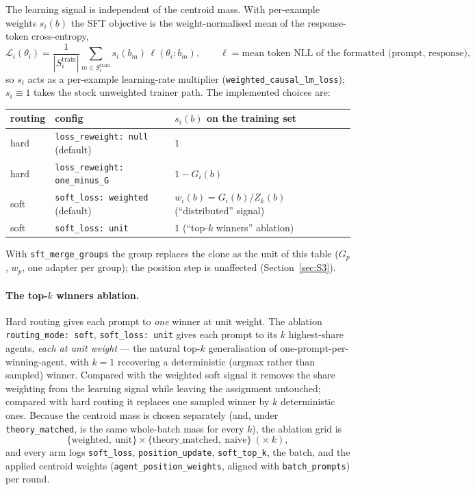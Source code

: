 \documentclass[11pt]{article}
\theoremstyle{remark}
\newcommand{\cfg}[1]{\texttt{#1}}
\begin{document}
The learning signal is independent of the centroid mass. With per-example
weights $s_i(b)$ the SFT objective is the weight-normalised mean of the
response-token cross-entropy,
\begin{equation}
  \mathcal{L}_i(\theta_i)=\frac{1}{|S_i^{\mathrm{train}}|}\sum_{m\in S_i^{\mathrm{train}}} s_i(b_m)\,\ell(\theta_i;b_m),
  \qquad \ell=\text{mean token NLL of the formatted (prompt, response)} ,
\end{equation}
so $s_i$ acts as a per-example learning-rate multiplier
(\texttt{weighted\_causal\_lm\_loss}); $s_i\equiv1$ takes the stock unweighted
trainer path. The implemented choices are:
\begin{center}
\begin{tabular}{@{}lll@{}}
\toprule
routing & config & $s_i(b)$ on the training set \\
\midrule
hard & \cfg{loss\_reweight: null} (default) & $1$ \\
hard & \cfg{loss\_reweight: one\_minus\_G} & $1-G_i(b)$ \\
soft & \cfg{soft\_loss: weighted} (default) & $w_i(b)=G_i(b)/Z_k(b)$ \quad(``distributed'' signal) \\
soft & \cfg{soft\_loss: unit} & $1$ \quad(``top-$k$ winners'' ablation) \\
\bottomrule
\end{tabular}
\end{center}
With \cfg{sft\_merge\_groups} the group replaces the clone as the unit of
this table ($G_p$, $w_p$, one adapter per group); the position step is
unaffected (Section~\ref{sec:S3}).

\paragraph{The top-$k$ winners ablation.}
Hard routing gives each prompt to \emph{one} winner at unit weight. The
ablation \cfg{routing\_mode: soft}, \cfg{soft\_loss: unit} gives each prompt
to its $k$ highest-share agents, \emph{each at unit weight} --- the natural
top-$k$ generalisation of one-prompt-per-winning-agent, with $k=1$ recovering
a deterministic (argmax rather than sampled) winner. Compared with the
weighted soft signal it removes the share weighting from the learning signal
while leaving the assignment untouched; compared with hard routing it
replaces one sampled winner by $k$ deterministic ones. Because the centroid
mass is chosen separately (and, under \cfg{theory\_matched}, is the same
whole-batch mass for every $k$), the ablation grid is
\[
  \{\text{weighted},\ \text{unit}\}\times\{\text{theory\_matched},\ \text{naive}\}
  \ (\times\ k),
\]
and every arm logs \texttt{soft\_loss}, \texttt{position\_update},
\texttt{soft\_top\_k}, the batch, and the applied centroid weights
(\texttt{agent\_position\_weights}, aligned with \texttt{batch\_prompts}) per
round.
\end{document}
